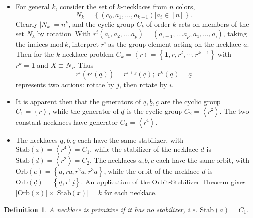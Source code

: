 \documentclass[english]{article}
\newtheorem{definition}[theorem]{Definition}
\begin{document}
\begin{itemize}
\item For general $k$, consider the set of $k$-necklaces from $n$ colors,\[
N_{k}=\left\{ \left(a_{0},a_{1},\ldots,a_{k-1}\right)|a_{i}\in\left[n\right]\right\} .\]
 $ $Clearly $\left|N_{k}\right|=n^{k}$, and the cyclic group $C_{k}$
of order $k$ acts on members of the set $N_{k}$ by rotation. With
$r^{i}\left(a_{1},a_{2},\ldots.a_{p}\right)=\left(a_{i+1},\ldots.a_{p},a_{1},\ldots,a_{i}\right)$,
taking the indices $\text{mod}\, k$, interpret $r^{i}$ as the group
element acting on the necklace $\underline{a}$. Then for the $k$-necklace
problem $C_{k}=\left\langle r\right\rangle =\left\{ \mathbf{1},r,r^{2},\cdots,r^{k-1}\right\} $
with $r^{k}=\mathbf{1}$ and $X\equiv N_{k}$. Thus\[
r^{i}\left(r^{j}\left(\underline{a}\right)\right)=r^{i+j}\left(\underline{a}\right);\; r^{k}\left(\underline{a}\right)=\underline{a}\]
represents two actions: rotate by $j$, then rotate by $i$. 
\item It is apparent then that the generators of $\underline{a},\underline{b},\underline{c}$
are the cyclic group $C_{1}=\left\langle r\right\rangle $, while
the generator of $\underline{d}$ is the cyclic group $C_{2}=\left\langle r^{2}\right\rangle $.
The two constant necklaces have generator $C_{4}=\left\langle r^{4}\right\rangle $.
\item The necklaces $ $$\underline{a},b,\underline{c}$ each have the same
stabilizer, with $\text{Stab}\left(\underline{a}\right)=\left\langle r^{4}\right\rangle =C_{1}$,
while the stabilizer of the necklace $\underline{d}$ is $\text{Stab}\left(\underline{d}\right)=\left\langle r^{2}\right\rangle =C_{2}$.
The necklaces $\underline{a},b,\underline{c}$ each have the same
orbit, with $\text{Orb}\left(\underline{a}\right)=\left\{ \underline{a},r\underline{a},r^{2}\underline{a},r^{3}\underline{a}\right\} $,
while the orbit of the necklace $\underline{d}$ is $\text{Orb}\left(\underline{d}\right)=\left\{ \underline{d},r^{1}\underline{d}\right\} $.
An application of the Orbit-Stabilizer Theorem gives $\left|\text{Orb}\left(x\right)\right|\times\left|\text{Stab}\left(x\right)\right|=k$
for each necklace.
\end{itemize}
\begin{definition}

A\emph{ }necklace\emph{ }is \emph{primitive} if it has no stabilizer,
i.e. $\text{Stab}\left(\underline{a}\right)=C_{1}$. 

\end{definition}
\end{document}
